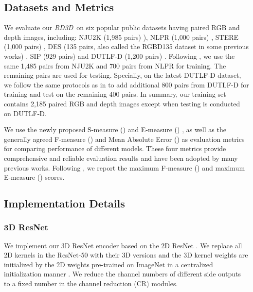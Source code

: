 \documentclass[letterpaper]{article}
\def\ourmodel{\emph{RD3D}}
\begin{document}
\subsection{Datasets and Metrics}
We evaluate our \ourmodel~on six popular public datasets having paired RGB and depth images, including: NJU2K (1,985 pairs) \cite{ju2014depth}), NLPR (1,000 pairs) \cite{peng2014rgbd}, STERE (1,000 pairs) \cite{niu2012leveraging}, DES (135 pairs, also called the RGBD135 dataset in some previous works) \cite{cheng2014depth}, SIP (929 pairs) \cite{fan2020rethinking} and DUTLF-D (1,200 pairs) \cite{piao2019depth}. Following \cite{chen2018progressively,chen2019multi,han2017cnns}, we use the same 1,485 pairs from NJU2K and 700 pairs from NLPR for training. The remaining pairs are used for testing. Specially, on the latest DUTLF-D dataset, we follow the same protocols as in \cite{piao2019depth,zhao2020single,piao2020a2dele,li2020rgb,ji2020accurate} to add additional 800 pairs from DUTLF-D for training and test on the remaining 400 pairs. In summary, our training set contains 2,185 paired RGB and depth images except when testing is conducted on DUTLF-D.

We use the newly proposed S-measure () \cite{fan2017structure} and E-measure () \cite{fan2018enhanced}, as well as the generally agreed F-measure () \cite{borji2015salient} and Mean Absolute Error () \cite{perazzi2012saliency} as evaluation metrics for comparing performance of different models. These four metrics provide comprehensive and reliable evaluation results and have been adopted by many previous works. Following \cite{fu2020jl}, we report the maximum F-measure () and maximum E-measure () scores.

\subsection{Implementation Details}
\subsubsection{3D ResNet}
We implement our 3D ResNet encoder based on the 2D ResNet \cite{ResNET}. We replace all 2D kernels in the ResNet-50 with their 3D versions and the 3D kernel weights are initialized by the 2D weights pre-trained on ImageNet \cite{russakovsky2015imagenet} in a centralized initialization manner \cite{girdhar2018detect}. We reduce the channel numbers of different side outputs to a fixed number  in the channel reduction (CR) modules.
\end{document}
